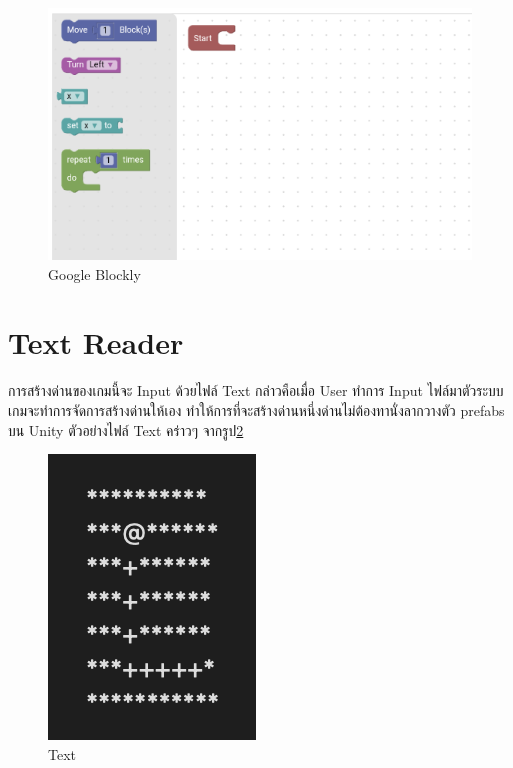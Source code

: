 \begin{figure}
\begin{center}
\includegraphics{pic/CodePanel.png}
\end{center}
\caption[Google Blockly]{Google Blockly}
\label{block}
\end{figure}

\section{Text Reader}
การสร้างด่านของเกมนี้จะ Input ด้วยไฟล์ Text กล่าวคือเมื่อ User ทำการ Input ไฟล์มาตัวระบบเกมจะทำการจัดการสร้างด่านให้เอง
ทำให้การที่จะสร้างด่านหนึ่งด่านไม่ต้องทานั่งลากวางตัว prefabs บน Unity ตัวอย่างไฟล์ Text คร่าวๆ จากรูป\ref{txt}
\begin{figure}
    \begin{center}
    \includegraphics{pic/text.png}
    \end{center}
    \caption[Text]{Text}
    \label{txt}
    \end{figure}
